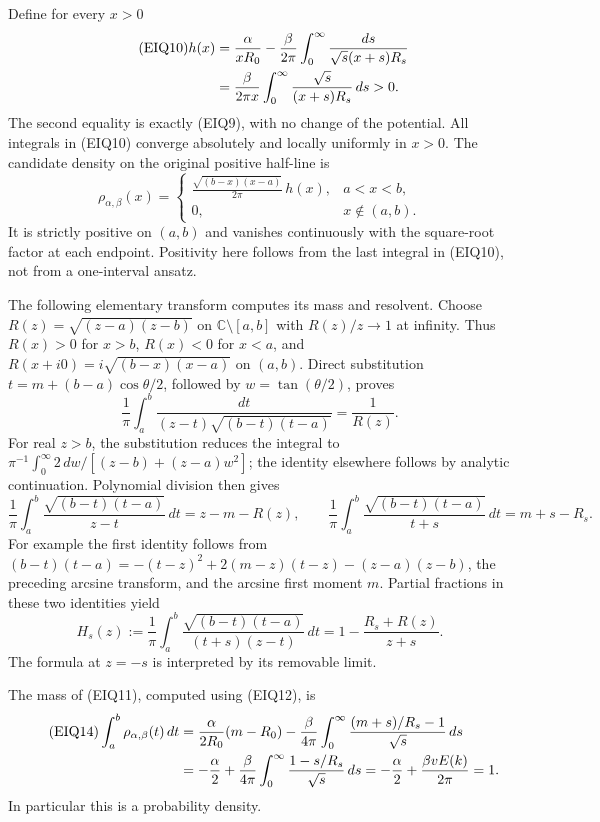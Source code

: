 \documentclass[11pt,a4paper]{article}
\begin{document}
Define for every $x>0$
\begin{align}\tag{EIQ10}
 h(x)
 &=\frac\alpha{xR_0}
   -\frac\beta{2\pi}
       \int_0^\infty\frac{ds}{\sqrt s(x+s)R_s} \\
 &=\frac\beta{2\pi x}
       \int_0^\infty\frac{\sqrt s}{(x+s)R_s}\,ds>0.\notag
\end{align}
The second equality is exactly (EIQ9), with no change of the potential.
All integrals in (EIQ10) converge absolutely and locally uniformly in
$x>0$.  The candidate density on the original positive half-line is
\begin{equation}\tag{EIQ11}
 \rho_{\alpha,\beta}(x)=
 \begin{cases}
 \displaystyle
 \frac{\sqrt{(b-x)(x-a)}}{2\pi}\,h(x),&a<x<b,\\
 0,&x\notin(a,b).
 \end{cases}
\end{equation}
It is strictly positive on $(a,b)$ and vanishes continuously with the
square-root factor at each endpoint.  Positivity here follows from the
last integral in (EIQ10), not from a one-interval ansatz.

The following elementary transform computes its mass and resolvent.
Choose $R(z)=\sqrt{(z-a)(z-b)}$ on $\mathbb C\setminus[a,b]$ with
$R(z)/z\to1$ at infinity. Thus $R(x)>0$ for $x>b$,
$R(x)<0$ for $x<a$, and $R(x+i0)=i\sqrt{(b-x)(x-a)}$ on $(a,b)$.
Direct substitution $t=m+(b-a)\cos\theta/2$, followed by
$w=\tan(\theta/2)$, proves
\[
 \frac1\pi\int_a^b\frac{dt}{(z-t)\sqrt{(b-t)(t-a)}}=\frac1{R(z)}.
\]
For real $z>b$, the substitution reduces the integral to
$\pi^{-1}\int_0^\infty2\,dw/[(z-b)+(z-a)w^2]$;
the identity elsewhere follows by analytic continuation.
Polynomial division then gives
\begin{equation}\tag{EIQ12}
 \frac1\pi\int_a^b\frac{\sqrt{(b-t)(t-a)}}{z-t}\,dt
     =z-m-R(z),\qquad
 \frac1\pi\int_a^b\frac{\sqrt{(b-t)(t-a)}}{t+s}\,dt
     =m+s-R_s.
\end{equation}
For example the first identity follows from
$(b-t)(t-a)=-(t-z)^2+2(m-z)(t-z)-(z-a)(z-b)$,
the preceding arcsine transform, and the arcsine first moment $m$.
Partial fractions in these two identities yield
\begin{equation}\tag{EIQ13}
 H_s(z):=\frac1\pi\int_a^b
       \frac{\sqrt{(b-t)(t-a)}}{(t+s)(z-t)}\,dt
       =1-\frac{R_s+R(z)}{z+s}.
\end{equation}
The formula at $z=-s$ is interpreted by its removable limit.

The mass of (EIQ11), computed using (EIQ12), is
\begin{align}\tag{EIQ14}
 \int_a^b\rho_{\alpha,\beta}(t)\,dt
 &=\frac\alpha{2R_0}(m-R_0)
 -\frac\beta{4\pi}\int_0^\infty
       \frac{(m+s)/R_s-1}{\sqrt s}\,ds\\
 &=-\frac\alpha2+
   \frac\beta{4\pi}\int_0^\infty\frac{1-s/R_s}{\sqrt s}\,ds
 =-\frac\alpha2+\frac{\beta vE(k)}{2\pi}=1.\notag
\end{align}
In particular this is a probability density.
\end{document}
